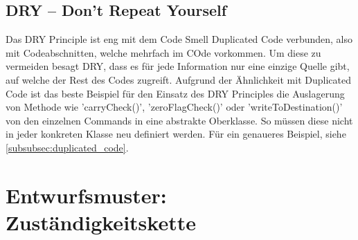 \documentclass[12pt,a4paper,titlepage,ngerman,pdftex]{report}
\begin{document}
	
	\subsection{DRY -- Don't Repeat Yourself}
	Das DRY Principle ist eng mit dem Code Smell Duplicated Code verbunden, also mit Codeabschnitten, welche mehrfach im COde vorkommen. Um diese zu vermeiden besagt DRY, dass es für jede Information nur eine einzige Quelle gibt, auf welche der Rest des Codes zugreift.
	Aufgrund der Ähnlichkeit mit Duplicated Code ist das beste Beispiel für den Einsatz des DRY Principles die Auslagerung von Methode wie 'carryCheck()', 'zeroFlagCheck()' oder 'writeToDestination()' von den einzelnen Commands in eine abstrakte Oberklasse. So müssen diese nicht in jeder konkreten Klasse neu definiert werden. Für ein genaueres Beispiel, siehe \autoref{subsubsec:duplicated_code}.  
	
	\section{Entwurfsmuster: Zuständigkeitskette}\label{sec:entwurfsmuster}
	
\end{document}
